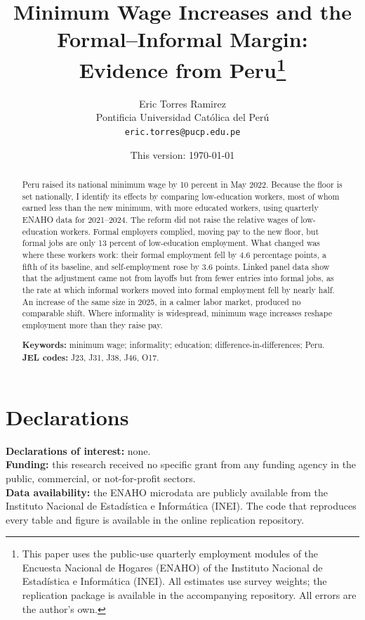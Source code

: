 \documentclass[12pt]{article}
\title{\textbf{Minimum Wage Increases and the Formal--Informal Margin:\\
Evidence from Peru}\thanks{This paper uses the public-use quarterly employment modules of the Encuesta Nacional de Hogares (ENAHO) of the Instituto Nacional de Estadística e Informática (INEI). All estimates use survey weights; the replication package is available in the accompanying repository. All errors are the author's own.}}
\author{Eric Torres Ramirez\\
  \small Pontificia Universidad Católica del Perú\\
  \small \texttt{eric.torres@pucp.edu.pe}}
\date{This version: \today}
\begin{document}
\maketitle

\begin{abstract}
\noindent Peru raised its national minimum wage by 10 percent in May 2022. Because the floor is set nationally, I identify its effects by comparing low-education workers, most of whom earned less than the new minimum, with more educated workers, using quarterly ENAHO data for 2021--2024. The reform did not raise the relative wages of low-education workers. Formal employers complied, moving pay to the new floor, but formal jobs are only 13 percent of low-education employment. What changed was where these workers work: their formal employment fell by 4.6 percentage points, a fifth of its baseline, and self-employment rose by 3.6 points. Linked panel data show that the adjustment came not from layoffs but from fewer entries into formal jobs, as the rate at which informal workers moved into formal employment fell by nearly half. An increase of the same size in 2025, in a calmer labor market, produced no comparable shift. Where informality is widespread, minimum wage increases reshape employment more than they raise pay.

\medskip
\noindent\textbf{Keywords:} minimum wage; informality; education; difference-in-differences; Peru.\\
\noindent\textbf{JEL codes:} J23, J31, J38, J46, O17.
\end{abstract}

\newpage
{}












\section*{Declarations}
\noindent\textbf{Declarations of interest:} none.\\
\textbf{Funding:} this research received no specific grant from any funding agency in the public, commercial, or not-for-profit sectors.\\
\textbf{Data availability:} the ENAHO microdata are publicly available from the Instituto Nacional de Estadística e Informática (INEI). The code that reproduces every table and figure is available in the online replication repository.

\newpage


\newpage
\appendix

\end{document}

